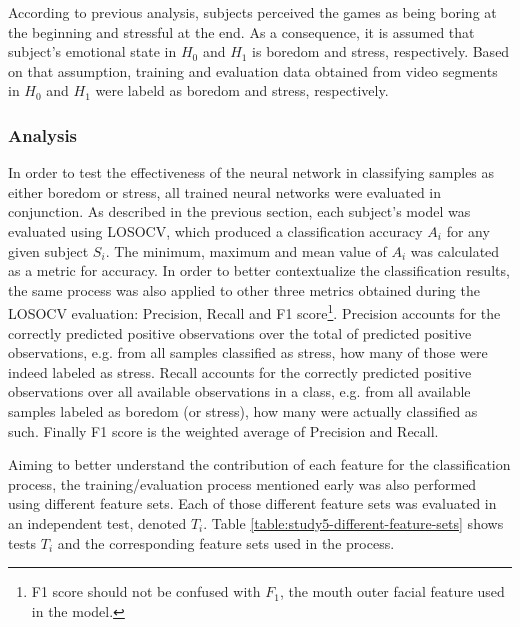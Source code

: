 According to previous analysis, subjects perceived the games as being boring at the beginning and stressful at the end. As a consequence, it is assumed that subject's emotional state in $H_0$ and $H_1$ is boredom and stress, respectively. Based on that assumption, training and evaluation data obtained from video segments in $H_0$ and $H_1$ were labeld as boredom and stress, respectively.



\subsubsection{Analysis}
\label{sec:experiment1-study5-analysis}

In order to test the effectiveness of the neural network in classifying samples as either boredom or stress, all trained neural networks were evaluated in conjunction. As described in the previous section, each subject's model was evaluated using LOSOCV, which produced a classification accuracy $A_i$ for any given subject $S_i$. The minimum, maximum and mean value of $A_i$ was calculated as a metric for accuracy. In order to better contextualize the classification results, the same process was also applied to other three metrics obtained during the LOSOCV evaluation: Precision, Recall and F1 score\footnote{F1 score should not be confused with $F_1$, the mouth outer facial feature used in the model.}. Precision accounts for the correctly predicted positive observations over the total of predicted positive observations, e.g. from all samples classified as stress, how many of those were indeed labeled as stress. Recall accounts for the correctly predicted positive observations over all available observations in a class, e.g. from all available samples labeled as boredom (or stress), how many were actually classified as such. Finally F1 score is the weighted average of Precision and Recall.

Aiming to better understand the contribution of each feature for the classification process, the training/evaluation process mentioned early was also performed using different feature sets. Each of those different feature sets was evaluated in an independent test, denoted $T_i$. Table \ref{table:study5-different-feature-sets} shows tests $T_i$ and the corresponding feature sets used in the process.

